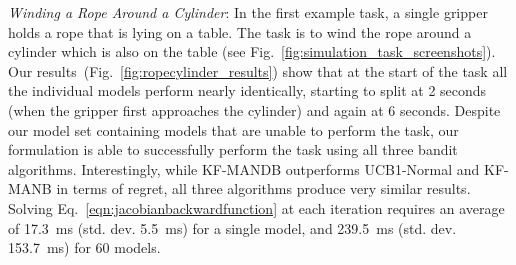\textit{Winding a Rope Around a Cylinder}: In the first example task, a single gripper holds a rope that is lying on a table. The task is to wind the rope around a cylinder which is also on the table (see Fig.~\ref{fig:simulation_task_screenshots}). Our results~(Fig.~\ref{fig:ropecylinder_results}) show that at the start of the task all the individual models perform nearly identically, starting to split at 2 seconds (when the gripper first approaches the cylinder) and again at 6 seconds. Despite our model set containing models that are unable to perform the task, our formulation is able to successfully perform the task using all three bandit algorithms. Interestingly, while KF-MANDB outperforms UCB1-Normal and KF-MANB in terms of regret, all three algorithms produce very similar results. Solving Eq.~\eqref{eqn:jacobianbackwardfunction} at each iteration requires an average of 17.3~ms (std. dev. 5.5~ms) for a single model, and 239.5~ms (std. dev. 153.7~ms) for 60 models.


\begin{figure*}[t]
    \centering
    \vspace{-0.1in}
    \\
    \vspace{-0.15in}
    \vspace{-0.1in}
    \caption{Experimental results for the rope-winding task. Top left: alignment error for 10 trials for each MAB algorithm, and each model in the model set when used in isolation. UCB1-Normal, KF-MANB, KF-MANDB lines overlap in the figure for all trials. Top right: Total regret averaged across 10 trials for each MAB algorithm with the minimum and maximum drawn in dashed lines. Bottom row: histograms of the number of times each model was selected by each MAB algorithm; UCB1-Normal (bl), KF-MANB (bm), KF-MANDB (br).}
    \label{fig:ropecylinder_results}
\end{figure*}



